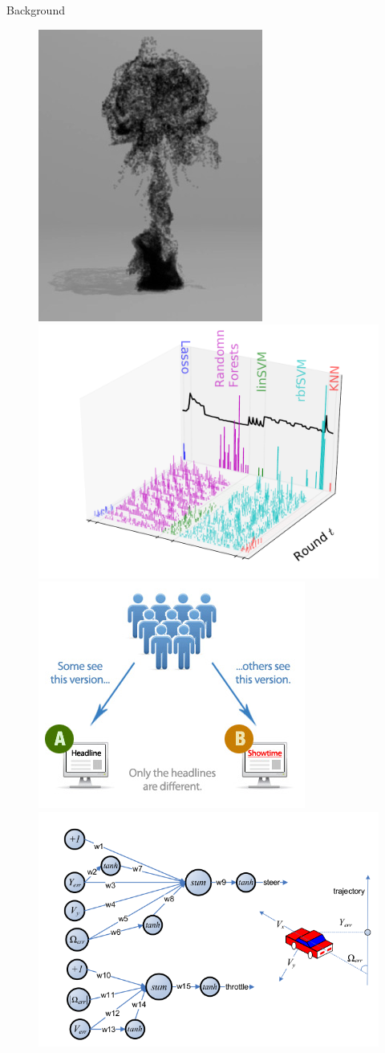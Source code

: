\documentclass[final]{beamer}
\begin{document}
\begin{frame}[t]
\begin{columns}[T]
\begin{column}{.48\textwidth}
\begin{block}{Background}
\begin{minipage}[r]{0.35\columnwidth}
\begin{figure}[t]
      \includegraphics[width=0.45\columnwidth]{../Presentation/figs/animation}  
      \includegraphics[width=0.55\columnwidth]{../Presentation/figs/wine_arms_EI_T40} \\
      \includegraphics[width=0.45\columnwidth]{../Presentation/figs/abtest}
      \includegraphics[width=0.55\columnwidth]{../Presentation/figs/control}
     \end{figure}
    \end{minipage}
  

\end{block}
\end{column}
\end{columns}
\end{frame}
\end{document}
